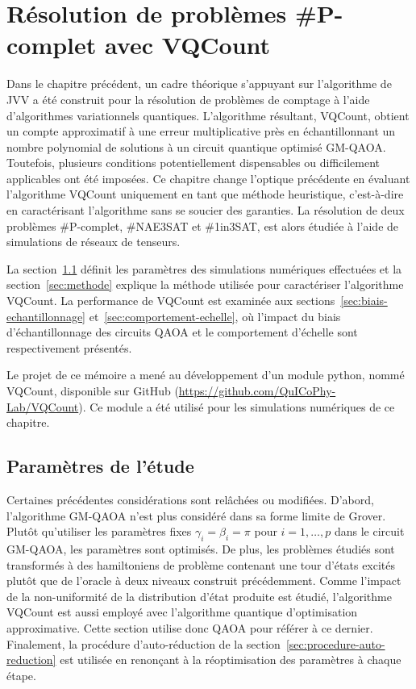 \chapter{Résolution de problèmes \textsf{\#P}-complet avec VQCount}
\label{cha:resolution-de-problemes-avec-vqcount}

Dans le chapitre précédent, un cadre théorique s'appuyant sur l'algorithme de JVV a été construit pour la résolution de problèmes de comptage à l'aide d'algorithmes variationnels quantiques. L'algorithme résultant, VQCount, obtient un compte approximatif à une erreur multiplicative près en échantillonnant un nombre polynomial de solutions à un circuit quantique optimisé GM-QAOA. Toutefois, plusieurs conditions potentiellement dispensables ou difficilement applicables ont été imposées. Ce chapitre change l'optique précédente en évaluant l'algorithme VQCount uniquement en tant que méthode heuristique, c'est-à-dire en caractérisant l'algorithme sans se soucier des garanties. La résolution de deux problèmes \textsf{\#P}-complet, \#NAE3SAT et \#1in3SAT, est alors étudiée à l'aide de simulations de réseaux de tenseurs.

La section~\ref{sec:parametres-de-etude} définit les paramètres des simulations numériques effectuées et la section~\ref{sec:methode} explique la méthode utilisée pour caractériser l'algorithme VQCount. La performance de VQCount est examinée aux sections~\ref{sec:biais-echantillonnage} et~\ref{sec:comportement-echelle}, où l'impact du biais d'échantillonnage des circuits QAOA et le comportement d'échelle sont respectivement présentés.

Le projet de ce mémoire a mené au développement d'un module python, nommé VQCount, disponible sur GitHub (\url{https://github.com/QuICoPhy-Lab/VQCount}). Ce module a été utilisé pour les simulations numériques de ce chapitre. 


\section{Paramètres de l'étude}
\label{sec:parametres-de-etude}

Certaines précédentes considérations sont relâchées ou modifiées. D'abord, 
l'algorithme GM-QAOA n'est plus considéré dans sa forme limite de Grover. Plutôt qu'utiliser les paramètres fixes $\gamma_{i}=\beta_{i}=\pi$ pour $i=1,\dots,p$ dans le circuit GM-QAOA, les paramètres sont optimisés. De plus, les problèmes étudiés sont transformés à des hamiltoniens de problème contenant une tour d'états excités plutôt que de l'oracle à deux niveaux construit précédemment. Comme l'impact de la non-uniformité de la distribution d'état produite est étudié, l'algorithme VQCount est aussi employé avec l'algorithme quantique d'optimisation approximative. Cette section utilise donc QAOA pour référer à ce dernier. Finalement, la procédure d'auto-réduction de la section~\ref{sec:procedure-auto-reduction} est utilisée en renonçant à la réoptimisation des paramètres à chaque étape.


